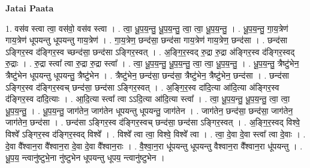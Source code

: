 \documentclass[17pt]{extarticle}
\begin{document}
\textbf{Jatai Paata} \newline

1. वस॑व स्त्वा त्वा॒ वस॑वो॒ वस॑व स्त्वा । . त्वा॒ धू॒प॒य॒न्तु॒ धू॒प॒य॒न्तु॒ त्वा॒ त्वा॒ धू॒प॒य॒न्तु॒ । . धू॒प॒य॒न्तु॒ गा॒य॒त्रेण॑ गाय॒त्रेण॑ धूपयन्तु धूपयन्तु गाय॒त्रेण॑ । . गा॒य॒त्रेण॒ छन्द॑सा॒ छन्द॑सा गाय॒त्रेण॑ गाय॒त्रेण॒ छन्द॑सा । . छन्द॑सा ऽङ्गिर॒स्व द॑ङ्गिर॒स्व च्छन्द॑सा॒ छन्द॑सा ऽङ्गिर॒स्वत् । . अ॒ङ्गि॒र॒स्वद् रु॒द्रा रु॒द्रा अ॑ङ्गिर॒स्व द॑ङ्गिर॒स्वद् रु॒द्राः । . रु॒द्रा स्त्वा᳚ त्वा रु॒द्रा रु॒द्रा स्त्वा᳚ । . त्वा॒ धू॒प॒य॒न्तु॒ धू॒प॒य॒न्तु॒ त्वा॒ त्वा॒ धू॒प॒य॒न्तु॒ । . धू॒प॒य॒न्तु॒ त्रैष्टु॑भेन॒ त्रैष्टु॑भेन धूपयन्तु धूपयन्तु॒ त्रैष्टु॑भेन । . त्रैष्टु॑भेन॒ छन्द॑सा॒ छन्द॑सा॒ त्रैष्टु॑भेन॒ त्रैष्टु॑भेन॒ छन्द॑सा । . छन्द॑सा ऽङ्गिर॒स्व द॑ङ्गिर॒स्वच् छन्द॑सा॒ छन्द॑सा ऽङ्गिर॒स्वत् । . अ॒ङ्गि॒र॒स्व दा॑दि॒त्या आ॑दि॒त्या अ॑ङ्गिर॒स्व द॑ङ्गिर॒स्व दा॑दि॒त्याः । . आ॒दि॒त्या स्त्वा᳚ त्वा ऽऽदि॒त्या आ॑दि॒त्या स्त्वा᳚ । . त्वा॒ धू॒प॒य॒न्तु॒ धू॒प॒य॒न्तु॒ त्वा॒ त्वा॒ धू॒प॒य॒न्तु॒ । . धू॒प॒य॒न्तु॒ जाग॑तेन॒ जाग॑तेन धूपयन्तु धूपयन्तु॒ जाग॑तेन । . जाग॑तेन॒ छन्द॑सा॒ छन्द॑सा॒ जाग॑तेन॒ जाग॑तेन॒ छन्द॑सा । . छन्द॑सा ऽङ्गिर॒स्व द॑ङ्गिर॒स्वच् छन्द॑सा॒ छन्द॑सा ऽङ्गिर॒स्वत् । . अ॒ङ्गि॒र॒स्वद् विश्वे॒ विश्वे᳚ ऽङ्गिर॒स्व द॑ङ्गिर॒स्वद् विश्वे᳚ । . विश्वे᳚ त्वा त्वा॒ विश्वे॒ विश्वे᳚ त्वा । . त्वा॒ दे॒वा दे॒वा स्त्वा᳚ त्वा दे॒वाः । . दे॒वा वै᳚श्वान॒रा वै᳚श्वान॒रा दे॒वा दे॒वा वै᳚श्वान॒राः । . वै॒श्वा॒न॒रा धू॑पयन्तु धूपयन्तु वैश्वान॒रा वै᳚श्वान॒रा धू॑पयन्तु । . धू॒प॒य॒ न्त्वानु॑ष्टुभे॒ना नु॑ष्टुभेन धूपयन्तु धूपय॒ न्त्वानु॑ष्टुभेन । \newline
\end{document}
